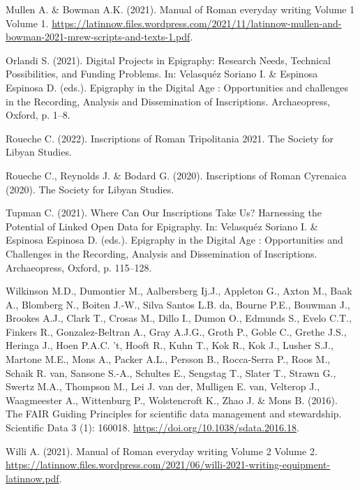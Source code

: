 \documentclass[
  12pt,
]{scrreprt}
\newlength{\cslhangindent}
\newlength{\cslentryspacingunit} %
\newenvironment{CSLReferences}[2] %
 {%
  \setlength{\parindent}{0pt}
  \ifodd #1
  \let\oldpar\par
  \def\par{\hangindent=\cslhangindent\oldpar}
  \fi
  \setlength{\parskip}{#2\cslentryspacingunit}
 }%
 {}
\begin{document}
\begin{CSLReferences}{1}{0}
\leavevmode{}%
Mullen A. \& Bowman A.K. (2021). Manual of {Roman} everyday writing
{Volume} 1 {Volume} 1.
\url{https://latinnow.files.wordpress.com/2021/11/latinnow-mullen-and-bowman-2021-mrew-scripts-and-texts-1.pdf}.

\leavevmode{}%
Orlandi S. (2021). Digital {Projects} in {Epigraphy}: {Research}
{Needs}, {Technical} {Possibilities}, and {Funding} {Problems}. In:
Velasquéz Soriano I. \& Espinosa Espinosa D. (eds.). Epigraphy in the
{Digital} {Age} : {Opportunities} and challenges in the {Recording},
{Analysis} and {Dissemination} of {Inscriptions}. Archaeopress, Oxford,
p. 1--8.

\leavevmode{}%
Roueche C. (2022). Inscriptions of {Roman} {Tripolitania} 2021. The
Society for Libyan Studies.

\leavevmode{}%
Roueche C., Reynolds J. \& Bodard G. (2020). Inscriptions of {Roman}
{Cyrenaica} (2020). The Society for Libyan Studies.

\leavevmode{}%
Tupman C. (2021). Where {Can} {Our} {Inscriptions} {Take} {Us}?
{Harnessing} the {Potential} of {Linked} {Open} {Data} for {Epigraphy}.
In: Velasquéz Soriano I. \& Espinosa Espinosa D. (eds.). Epigraphy in
the {Digital} {Age} : {Opportunities} and {Challenges} in the
{Recording}, {Analysis} and {Dissemination} of {Inscriptions}.
Archaeopress, Oxford, p. 115--128.

\leavevmode{}%
Wilkinson M.D., Dumontier M., Aalbersberg Ij.J., Appleton G., Axton M.,
Baak A., Blomberg N., Boiten J.-W., Silva Santos L.B. da, Bourne P.E.,
Bouwman J., Brookes A.J., Clark T., Crosas M., Dillo I., Dumon O.,
Edmunds S., Evelo C.T., Finkers R., Gonzalez-Beltran A., Gray A.J.G.,
Groth P., Goble C., Grethe J.S., Heringa J., Hoen P.A.C. 't, Hooft R.,
Kuhn T., Kok R., Kok J., Lusher S.J., Martone M.E., Mons A., Packer
A.L., Persson B., Rocca-Serra P., Roos M., Schaik R. van, Sansone S.-A.,
Schultes E., Sengstag T., Slater T., Strawn G., Swertz M.A., Thompson
M., Lei J. van der, Mulligen E. van, Velterop J., Waagmeester A.,
Wittenburg P., Wolstencroft K., Zhao J. \& Mons B. (2016). The {FAIR}
{Guiding} {Principles} for scientific data management and stewardship.
Scientific Data 3 (1): 160018.
\url{https://doi.org/10.1038/sdata.2016.18}.

\leavevmode{}%
Willi A. (2021). Manual of {Roman} everyday writing {Volume} 2 {Volume}
2.
\url{https://latinnow.files.wordpress.com/2021/06/willi-2021-writing-equipment-latinnow.pdf}.

\end{CSLReferences}
\end{document}
